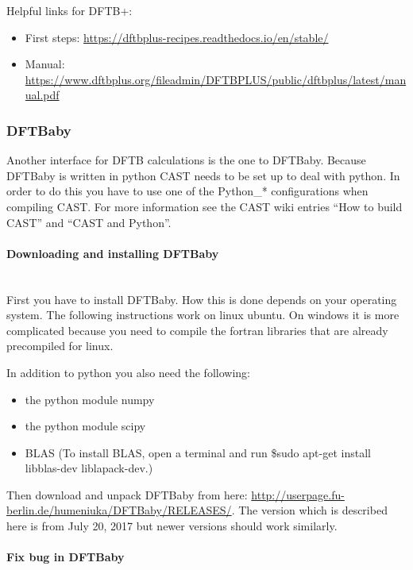 \documentclass[10pt,a4paper]{article} %
\begin{document}
Helpful links for DFTB+:
\begin{itemize}
\item First steps: \url{https://dftbplus-recipes.readthedocs.io/en/stable/}
\item Manual: \url{https://www.dftbplus.org/fileadmin/DFTBPLUS/public/dftbplus/latest/manual.pdf}
\end{itemize}


\subsubsection{DFTBaby} \label{sec:DFTB}

Another interface for DFTB calculations is the one to DFTBaby\supercite{noauthor_dftbaby_nodate}. Because DFTBaby is written in python CAST needs to be set up to deal with python. In order to do this you have to use one of the Python\_* configurations when compiling \ac{CAST}. For more information see the CAST wiki entries ``How to build CAST'' and ``CAST and Python''.


\paragraph{Downloading and installing DFTBaby}\mbox{}\\

First you have to install DFTBaby. How this is done depends on your operating system. The following instructions work on linux ubuntu. On windows it is more complicated because you need to compile the fortran libraries that are already precompiled for linux.

In addition to python you also need the following:
\begin{itemize}
\item the python module numpy
\item the python module scipy
\item BLAS (To install BLAS, open a terminal and run \$sudo apt-get install libblas-dev liblapack-dev.)
\end{itemize}

Then download and unpack DFTBaby from here: \url{http://userpage.fu-berlin.de/humeniuka/DFTBaby/RELEASES/}. The version which is described here is from July 20, 2017 but newer versions should work similarly.

\paragraph{Fix bug in DFTBaby}\mbox{}\\
\end{document}
